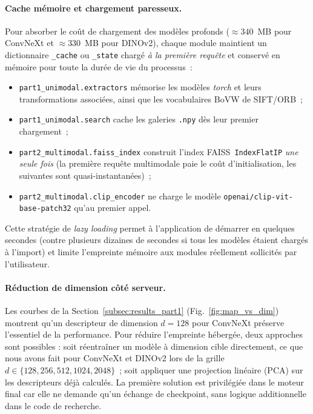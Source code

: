 \documentclass[a4paper,11pt]{article}
\begin{document}
\paragraph{Cache mémoire et chargement paresseux.}
Pour absorber le coût de chargement des modèles profonds
($\approx 340$~MB pour ConvNeXt et $\approx 330$~MB pour DINOv2), chaque module
maintient un dictionnaire \texttt{\_cache} ou \texttt{\_state} chargé
\emph{à la première requête} et conservé en mémoire pour toute la durée
de vie du processus~:
\begin{itemize}
    \item \texttt{part1\_unimodal.extractors} mémorise les modèles
    \textit{torch} et leurs transformations associées, ainsi que les
    vocabulaires BoVW de SIFT/ORB~;
    \item \texttt{part1\_unimodal.search} cache les galeries
    \texttt{.npy} dès leur premier chargement~;
    \item \texttt{part2\_multimodal.faiss\_index} construit l'index
    FAISS~\texttt{IndexFlatIP} \emph{une seule fois} (la première
    requête multimodale paie le coût d'initialisation, les suivantes
    sont quasi-instantanées)~;
    \item \texttt{part2\_multimodal.clip\_encoder} ne charge le modèle
    \texttt{openai/clip-vit-base-patch32} qu'au premier appel.
\end{itemize}
Cette stratégie de \textit{lazy loading} permet à l'application de
démarrer en quelques secondes (contre plusieurs dizaines de secondes
si tous les modèles étaient chargés à l'import) et limite l'empreinte
mémoire aux modules réellement sollicités par l'utilisateur.

\paragraph{Réduction de dimension côté serveur.}
Les courbes de la Section~\ref{subsec:results_part1}
(Fig.~\ref{fig:map_vs_dim}) montrent qu'un descripteur de dimension
$d=128$ pour ConvNeXt préserve l'essentiel de la performance. Pour
réduire l'empreinte hébergée, deux approches sont possibles : soit
réentraîner un modèle à dimension cible directement, ce que nous avons
fait pour ConvNeXt et DINOv2 lors de la grille
$d \in \{128,256,512,1024,2048\}$~; soit appliquer une projection
linéaire (PCA) sur les descripteurs déjà calculés. La première solution
est privilégiée dans le moteur final car elle ne demande qu'un échange
de checkpoint, sans logique additionnelle dans le code de recherche.
\end{document}

